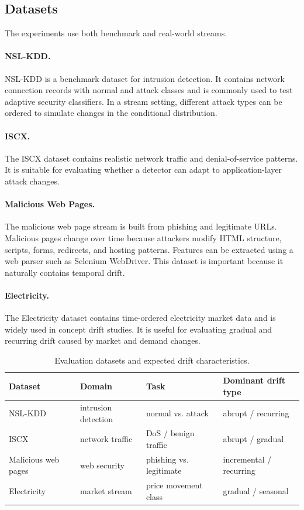 ﻿\documentclass[12pt,a4paper]{article}
\begin{document}
\subsection{Datasets}
The experiments use both benchmark and real-world streams.

\paragraph{NSL-KDD.}
NSL-KDD is a benchmark dataset for intrusion detection. It contains network connection records with normal and attack classes and is commonly used to test adaptive security classifiers. In a stream setting, different attack types can be ordered to simulate changes in the conditional distribution.

\paragraph{ISCX.}
The ISCX dataset contains realistic network traffic and denial-of-service patterns. It is suitable for evaluating whether a detector can adapt to application-layer attack changes.

\paragraph{Malicious Web Pages.}
The malicious web page stream is built from phishing and legitimate URLs. Malicious pages change over time because attackers modify HTML structure, scripts, forms, redirects, and hosting patterns. Features can be extracted using a web parser such as Selenium WebDriver. This dataset is important because it naturally contains temporal drift.

\paragraph{Electricity.}
The Electricity dataset contains time-ordered electricity market data and is widely used in concept drift studies. It is useful for evaluating gradual and recurring drift caused by market and demand changes.

\begin{table}[H]
\centering
\caption{Evaluation datasets and expected drift characteristics.}
\label{tab:datasets}
\renewcommand{\arraystretch}{1.25}
\begin{tabular}{llll}
\toprule
\textbf{Dataset} & \textbf{Domain} & \textbf{Task} & \textbf{Dominant drift type}\\
\midrule
NSL-KDD & intrusion detection & normal vs. attack & abrupt / recurring\\
ISCX & network traffic & DoS / benign traffic & abrupt / gradual\\
Malicious web pages & web security & phishing vs. legitimate & incremental / recurring\\
Electricity & market stream & price movement class & gradual / seasonal\\
\bottomrule
\end{tabular}
\end{table}
\end{document}
